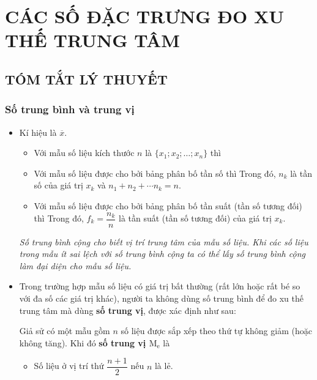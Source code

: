 \section{CÁC SỐ ĐẶC TRƯNG ĐO XU THẾ TRUNG TÂM}
\subsection{TÓM TẮT LÝ THUYẾT}
\subsubsection{Số trung bình và trung vị}
\begin{itemize}
	\item [\iconMT]  Kí hiệu là $\overline{x}$.
	\begin{tcolorbox}[colframe=orange,colback=white,boxrule=0.2mm,breakable]
		\begin{itemize}
			\item Với mẫu số liệu kích thước $n$ là $\{x_1; x_2;\ldots; x_{n}\}$ thì 
			\item Với mẫu số liệu được cho bởi bảng phân bố tần số thì 
			Trong đó, $n_k$ là tần số của giá trị $x_k$ và $n_1+n_2+\cdots n_k=n$.
			\item Với mẫu số liệu được cho bởi bảng phân bố tần suất (tần số tương đối) thì
			Trong đó, $f_k=\dfrac{n_k}{n}$ là tần suất (tần số tương đối) của giá trị $x_k$.
		\end{itemize}
	\end{tcolorbox}
	\textit{ Số trung bình cộng cho biết vị trí trung tâm của mẫu số liệu. Khi các số liệu trong mẫu ít sai lệch với số trung bình cộng ta có thể lấy số trung bình cộng làm đại diện cho mẫu số liệu.}
	\item [\iconMT]  Trong trường hợp mẫu số liệu có giá trị bất thường (rất lớn hoặc rất bé so với đa số các giá trị khác), người ta không dùng số trung bình để đo xu thế trung tâm mà dùng \textbf{số trung vị}, được xác định như sau:
	\begin{tcolorbox}[colframe=orange,colback=white,boxrule=0.2mm]
			Giả sử có một mẫu gồm $n$ số liệu được sắp xếp theo thứ tự không giảm (hoặc không tăng). Khi đó \textbf{số trung vị $\mathrm{M_e}$} là
		\begin{itemize}
			\item Số liệu ở vị trí thứ $\dfrac{n+1}{2}$ nếu $n$ là lẻ.

\end{itemize}
\end{tcolorbox}
\end{itemize}
